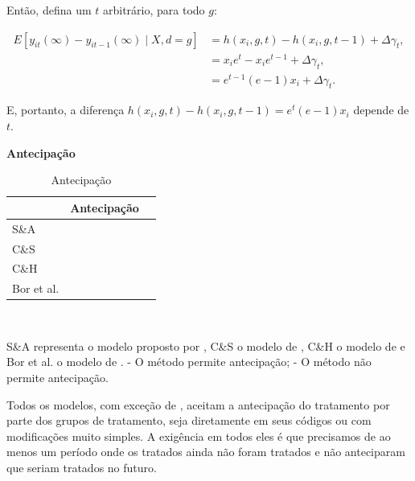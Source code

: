 \documentclass[portugues]{article}
\newcommand{\cmark}{\textcolor{darkgreen}{\ding{51}}} %
\newcommand{\xmark}{\textcolor{darkred}{\ding{55}}} %
\begin{document}
\begin{box_ex}
Então, defina um $t$ arbitrário, para todo $g$:

\[
\begin{split}
    E[y_{it}(\infty) - y_{it-1}(\infty) \mid X, d = g] &= h(x_i, g, t) - h(x_i, g, t-1) + \Delta \gamma_t, \\
    &= x_i e^{t} - x_i e^{t-1} + \Delta \gamma_t, \\
    &= e^{t-1} (e - 1) x_i + \Delta \gamma_t.
\end{split}
\]

E, portanto, a diferença $h(x_i, g, t) - h(x_i, g, t-1) = e^{t} (e -1)x_i$ depende de $t$.



\end{box_ex}

\vspace{5mm}

\textbf{Antecipação}

\vspace{2.5mm}

\begin{table}[!htp]
    
    \centering
    \caption{Antecipação}
    \label{tab:resumo_hip}
    \begin{tabular}{|l|c|c|}
    \hline
            & Antecipação   \\
    \hline
    S\&A    & \xmark \\
    C\&S    & \cmark \\
    C\&H    & \cmark \\
    Bor et al. & \cmark\\
    \hline
    \end{tabular}
    \\ {\footnotesize \begin{flushleft} S\&A representa o modelo proposto por \cite{sun2021estimating}, C\&S o modelo de \cite{callaway2021difference}, C\&H o modelo de \cite{de2020two} e Bor et al. o modelo de \cite{borusyak2024revisiting}.  \cmark - O método permite antecipação; \xmark - O método não permite antecipação. \end{flushleft}}
\end{table}

Todos os modelos, com exceção de \cite{sun2021estimating}, aceitam a antecipação do tratamento por parte dos grupos de tratamento, seja diretamente em seus códigos ou com modificações muito simples. A exigência em todos eles é que precisamos de ao menos um período onde os tratados ainda não foram tratados e não anteciparam que seriam tratados no futuro.
\end{document}

